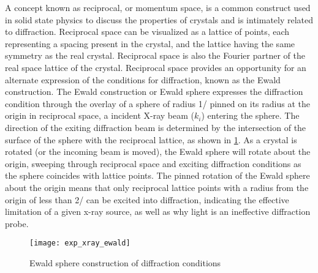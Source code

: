 A concept known as reciprocal, or momentum space, is a common construct used in solid state physics to discuss the properties of crystals and is intimately related to diffraction. Reciprocal space can be visualized as a lattice of points, each representing a spacing present in the crystal, and the lattice having the same symmetry as the real crystal. Reciprocal space is also the Fourier partner of the real space lattice of the crystal. Reciprocal space provides an opportunity for an alternate expression of the conditions for diffraction, known as the Ewald construction. The Ewald construction or Ewald sphere expresses the diffraction condition through the overlay of a sphere of radius 1/\textlambda{} pinned on its radius at the origin in reciprocal space, a incident X-ray beam ($k_i$) entering the sphere. The direction of the exiting diffraction beam is determined by the intersection of the surface of the sphere with the reciprocal lattice, as shown in \cref{fig:exp_xray_ewald}. As a crystal is rotated (or the incoming beam is moved), the Ewald sphere will rotate about the origin, sweeping through reciprocal space and exciting diffraction conditions as the sphere coincides with lattice points. The pinned rotation of the Ewald sphere about the origin means that only reciprocal lattice points with a radius from the origin of less than 2/\textlambda{} can be excited into diffraction, indicating the effective limitation of a given x-ray source, as well as why light is an ineffective diffraction probe.
\begin{figure}
\centering
\texttt{[image: exp\_xray\_ewald]}
\caption[Ewald sphere]{\label{fig:exp_xray_ewald}Ewald sphere construction of diffraction conditions\cite{bobhe}}
\end{figure}


